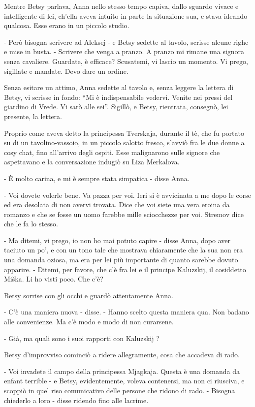 Mentre Betsy parlava, Anna nello stesso tempo capiva, dallo sguardo vivace e intelligente di lei, ch'ella aveva intuito in parte la situazione sua, e stava ideando qualcosa. Esse erano in un piccolo studio. 

- Però bisogna scrivere ad Aleksej - e Betsy sedette al tavolo, scrisse alcune righe e mise in busta. - Scrivere che venga a pranzo. A pranzo mi rimane una signora senza cavaliere. Guardate, è efficace? Scusatemi, vi lascio un momento. Vi prego, sigillate e mandate. Devo dare un ordine. 

Senza esitare un attimo, Anna sedette al tavolo e, senza leggere la lettera di Betsy, vi scrisse in fondo: ``Mi è indispensabile vedervi. Venite nei pressi del giardino di Vrede. Vi sarò alle sei''. Sigillò, e Betsy, rientrata, consegnò, lei presente, la lettera. 

Proprio come aveva detto la principessa Tverskaja, durante il tè, che fu portato su di un tavolino-vassoio, in un piccolo salotto fresco, s'avviò fra le due donne a cosy chat, fino all'arrivo degli ospiti. Esse malignarono sulle signore che aspettavano e la conversazione indugiò su Liza Merkalova. 

- È molto carina, e mi è sempre stata simpatica - disse Anna. 

- Voi dovete volerle bene. Va pazza per voi. Ieri si è avvicinata a me dopo le corse ed era desolata di non avervi trovata. Dice che voi siete una vera eroina da romanzo e che se fosse un uomo farebbe mille sciocchezze per voi. Stremov dice che le fa lo stesso. 

- Ma ditemi, vi prego, io non ho mai potuto capire - disse Anna, dopo aver taciuto un po', e con un tono tale che mostrava chiaramente che la sua non era una domanda oziosa, ma era per lei più importante di quanto sarebbe dovuto apparire. - Ditemi, per favore, che c'è fra lei e il principe Kaluzskij, il cosiddetto Miška. Li ho visti poco. Che c'è? 

Betsy sorrise con gli occhi e guardò attentamente Anna. 

- C'è una maniera nuova - disse. - Hanno scelto questa maniera qua. Non badano alle convenienze. Ma c'è modo e modo di non curarsene. 

- Già, ma quali sono i suoi rapporti con Kaluzskij ? 

Betsy d'improvviso cominciò a ridere allegramente, cosa che accadeva di rado. 

- Voi invadete il campo della principessa Mjagkaja. Questa è una domanda da enfant terrible - e Betsy, evidentemente, voleva contenersi, ma non ci riusciva, e scoppiò in quel riso comunicativo delle persone che ridono di rado. - Bisogna chiederlo a loro - disse ridendo fino alle lacrime. 


